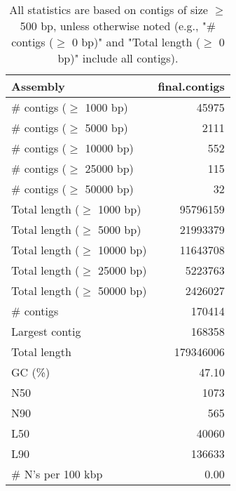 \documentclass[12pt,a4paper]{article}
\begin{document}
\begin{table}[ht]
\begin{center}
\caption{All statistics are based on contigs of size $\geq$ 500 bp, unless otherwise noted (e.g., "\# contigs ($\geq$ 0 bp)" and "Total length ($\geq$ 0 bp)" include all contigs).}
\begin{tabular}{|l*{1}{|r}|}
\hline
Assembly & final.contigs \\ \hline
\# contigs ($\geq$ 1000 bp) & 45975 \\ \hline
\# contigs ($\geq$ 5000 bp) & 2111 \\ \hline
\# contigs ($\geq$ 10000 bp) & 552 \\ \hline
\# contigs ($\geq$ 25000 bp) & 115 \\ \hline
\# contigs ($\geq$ 50000 bp) & 32 \\ \hline
Total length ($\geq$ 1000 bp) & 95796159 \\ \hline
Total length ($\geq$ 5000 bp) & 21993379 \\ \hline
Total length ($\geq$ 10000 bp) & 11643708 \\ \hline
Total length ($\geq$ 25000 bp) & 5223763 \\ \hline
Total length ($\geq$ 50000 bp) & 2426027 \\ \hline
\# contigs & 170414 \\ \hline
Largest contig & 168358 \\ \hline
Total length & 179346006 \\ \hline
GC (\%) & 47.10 \\ \hline
N50 & 1073 \\ \hline
N90 & 565 \\ \hline
L50 & 40060 \\ \hline
L90 & 136633 \\ \hline
\# N's per 100 kbp & 0.00 \\ \hline
\end{tabular}
\end{center}
\end{table}
\end{document}

